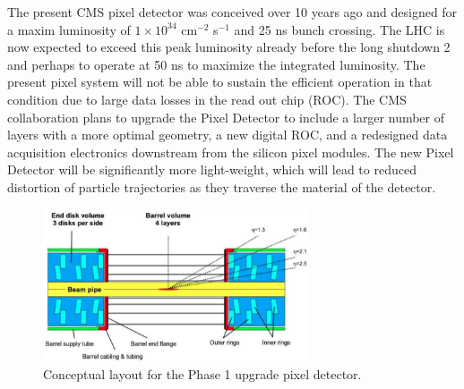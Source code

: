 


The present CMS pixel detector was conceived over 10 years ago and
designed for a maxim luminosity of $1 \times 10^{34}$ cm$^{-2}$
s$^{-1}$ and 25 ns bunch crossing. The LHC is now expected to exceed
this peak luminosity already before the long shutdown 2 and perhaps to
operate at 50 ns to maximize the integrated luminosity. The present
pixel system will not be able to sustain the efficient operation in
that condition due to large data losses in the read out chip (ROC).
The CMS collaboration plans to upgrade the Pixel Detector to include a
larger number of layers with a more optimal geometry, a new digital
ROC, and a redesigned data acquisition electronics downstream from the
silicon pixel modules. The new Pixel Detector will be significantly
more light-weight, which will lead to reduced distortion of particle
trajectories as they traverse the material of the detector. 

\begin{figure}[htb]
  \centering
  \includegraphics[width=0.7\textwidth]{Phase_1_pixel_detector.png}
  \caption{\label{fig:phase1pixels}
    Conceptual layout for the Phase 1 upgrade pixel detector.
  }
\end{figure}

